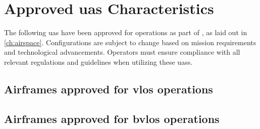 \chapter{Approved \ac{uas} Characteristics}\label{ch:approved_uas}

The following \ac{uas} have been approved for operations as part of \projectmars, as laid out in \cref{ch:airspace}. Configurations are subject to change based on mission requirements and technological advancements. Operators must ensure compliance with all relevant regulations and guidelines when utilizing these \acp{uas}.

    \section{Airframes approved for \ac{vlos} operations}

    \section{Airframes approved for \ac{bvlos} operations}
